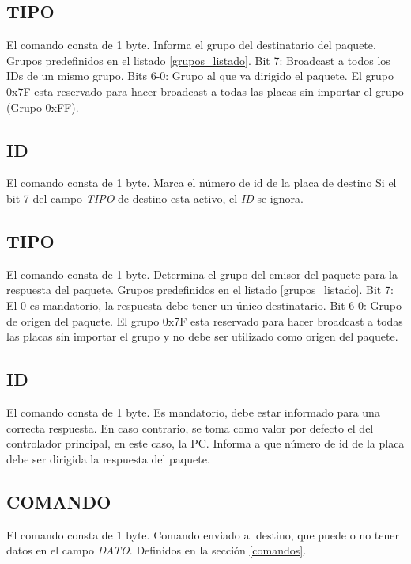 \documentclass[a4paper,11pt]{article}
\begin{document}
\subsection{TIPO}
\label{tipo_destinatario}

	El comando consta de 1 byte.
	Informa el grupo del destinatario del paquete.
	Grupos predefinidos en el listado \ref{grupos_listado}.
	Bit 7: Broadcast a todos los IDs de un mismo grupo.
	Bits 6-0: Grupo al que va dirigido el paquete. El grupo 0x7F esta reservado para hacer broadcast a todas las placas sin importar el grupo (Grupo 0xFF).

\subsection{ID}
\label{id_destinatario}

	El comando consta de 1 byte.
	Marca el n\'umero de id de la placa de destino
	Si el bit 7 del campo \emph{TIPO} de destino esta activo, el \emph{ID} se ignora.

\subsection{TIPO}
\label{tipo_emisor}

	El comando consta de 1 byte.
	Determina el grupo del emisor del paquete para la respuesta del paquete.
	Grupos predefinidos en el listado \ref{grupos_listado}.
	Bit 7: El 0 es mandatorio, la respuesta debe tener un \'unico destinatario.
	Bit 6-0: Grupo de origen del paquete.
	El grupo 0x7F esta reservado para hacer broadcast a todas las placas sin importar el grupo y no debe ser utilizado como origen del paquete.

\subsection{ID}
\label{id_emisor}

	El comando consta de 1 byte.
	Es mandatorio, debe estar informado para una correcta respuesta. En caso contrario, se toma como valor por defecto el del controlador principal, en este caso, la PC.
	Informa a que n\'umero de id de la placa debe ser dirigida la respuesta del paquete.
	
\subsection{COMANDO}
\label{comando}

	El comando consta de 1 byte.
	Comando enviado al destino, que puede o no tener datos en el campo \emph{DATO}.
	Definidos en la secci\'on \ref{comandos}.
\end{document}
